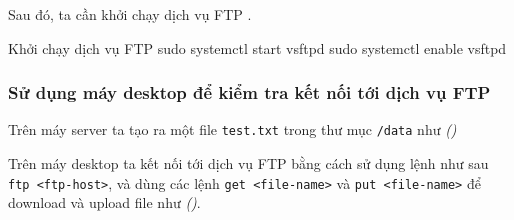 Sau đó, ta cần khởi chạy dịch vụ FTP .

\begin{coding}{Khởi chạy dịch vụ FTP}
  sudo systemctl start vsftpd
  sudo systemctl enable vsftpd
\end{coding}

\subsubsection{Sử dụng máy desktop để kiểm tra kết nối tới dịch vụ FTP}
Trên máy server ta tạo ra một file \texttt{test.txt}
trong thư mục \texttt{/data} như  \textit{()}



Trên máy desktop ta kết nối tới dịch vụ FTP
bằng cách sử dụng lệnh như sau \texttt{ftp <ftp-host>},
và dùng các lệnh \texttt{get <file-name>} và
\texttt{put <file-name>} để download và upload file như \textit{()}.

